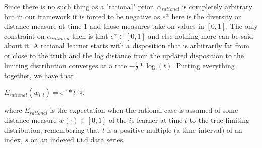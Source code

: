 Since there is no such thing as a "rational" prior, $\alpha_{rational}$ is completely arbitrary but in our framework it is forced to be negative as $e^{\alpha}$ here is the diversity or distance measure at time $1$ and those measures take on values in $[0, 1]$. The only constraint on $\alpha_{rational}$ then is that $e^{\alpha}\in [0, 1]$ and else nothing more can be said about it. A rational learner starts with a disposition that is arbitrarily far from or close to the truth and the log distance from the updated disposition to the limiting distribution converges at a rate $-\frac{1}{2}*\log(t)$.  Putting everything together, we have that 

$E_{rational}(w_{i,t}) =e^{\alpha}*t^{-\frac{1}{2}},$

where $E_{rational}$ is the expectation when the rational case is assumed of some distance measure $w(\cdot) \in [0,1]$ of the $i$s learner at time $t$ to the true limiting distribution, remembering that $t$ is a positive multiple (a time interval) of an index, $s$ on an indexed i.i.d data series. 